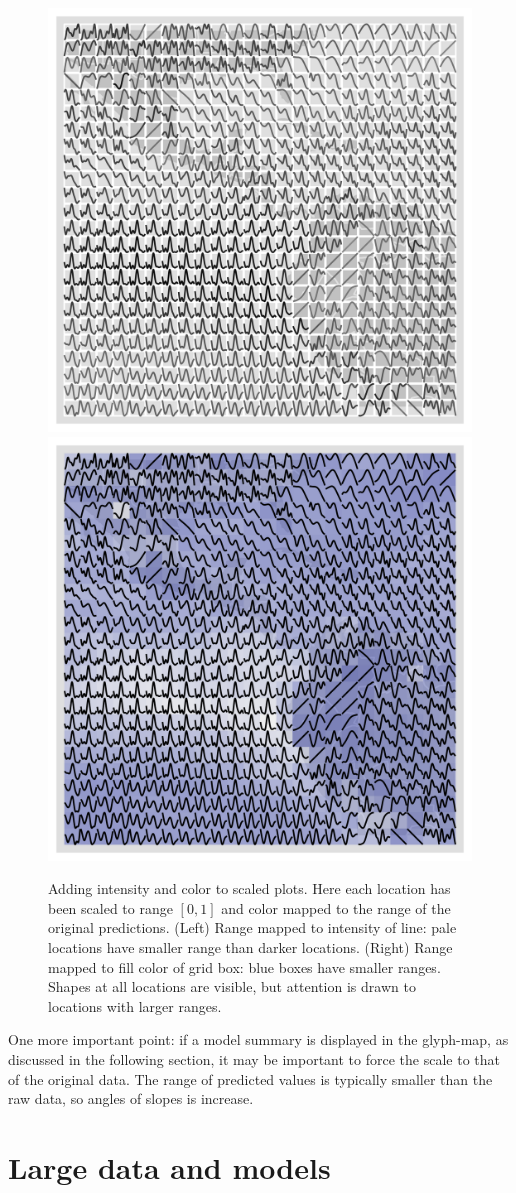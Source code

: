 \documentclass[oneside]{article}
\begin{document}
\begin{figure}[htbp]
 \centering
 \includegraphics[width=0.5\linewidth]{month-rescale01-col}%
 \includegraphics[width=0.5\linewidth]{month-rescale01-fill}
 \caption{Adding intensity and color to scaled plots. Here each location has been scaled to range $[0, 1]$ and color mapped to the range of the original predictions. (Left) Range mapped to intensity of line: pale locations have smaller range than darker locations. (Right) Range mapped to fill color of grid box: blue boxes have smaller ranges. Shapes at all locations are visible, but attention is drawn to locations with larger ranges.}
 \label{fig:scaling-col}
\end{figure}

One more important point: if a model summary is displayed in the glyph-map, as discussed in the following section, it may be important to force the scale to that of the original data. The range of predicted values is typically smaller than the raw data, so angles of slopes is increase.  


\section{Large data and models}
\label{sec:large-data}
\end{document}
